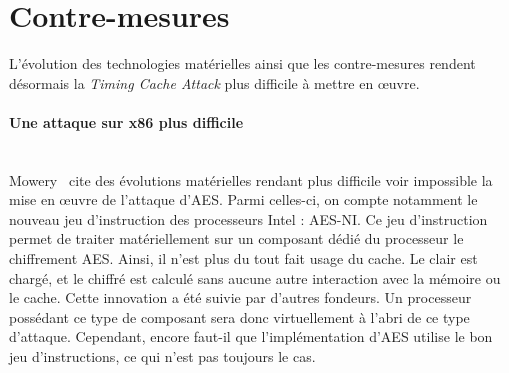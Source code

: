 \documentclass[a4paper,11pt]{article}
\begin{document}
\section{Contre-mesures}

L'évolution des technologies matérielles ainsi que les contre-mesures rendent désormais la \emph{Timing Cache Attack} plus difficile à mettre en \oe uvre.

\paragraph{Une attaque sur x86 plus difficile}~\\
Mowery~\cite{mowery2012aes} cite des évolutions matérielles rendant plus difficile voir impossible la mise en œuvre de l'attaque d'AES. Parmi celles-ci, on compte notamment le nouveau jeu d'instruction des processeurs Intel : AES-NI. Ce jeu d'instruction permet de traiter matériellement sur un composant dédié du processeur le chiffrement AES. Ainsi, il n'est plus du tout fait usage du cache. Le clair est chargé, et le chiffré est calculé sans aucune autre interaction avec la mémoire ou le cache.
Cette innovation a été suivie par d'autres fondeurs. Un processeur possédant ce type de composant sera donc virtuellement à l'abri de ce type d'attaque. Cependant, encore faut-il que l'implémentation d'AES utilise le bon jeu d'instructions, ce qui n'est pas toujours le cas.
\end{document}
